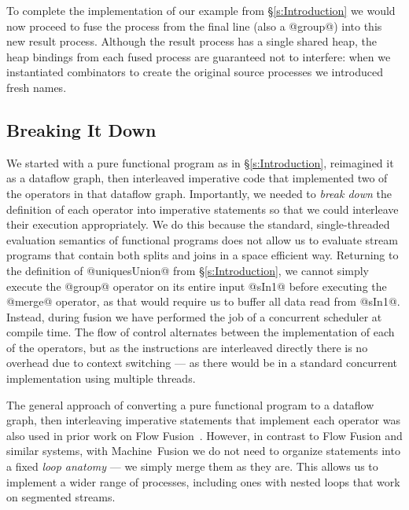 To complete the implementation of our example from \S\ref{s:Introduction} we would now proceed to fuse the process from the final line (also a @group@) into this new result process.
Although the result process has a single shared heap, the heap bindings from each fused process are guaranteed not to interfere: when we instantiated combinators to create the original source processes we introduced fresh names. 


\subsection{Breaking It Down}
We started with a pure functional program as in \S\ref{s:Introduction}, reimagined it as a dataflow graph, then interleaved imperative code that implemented two of the operators in that dataflow graph. Importantly, we needed to \emph{break down} the definition of each operator into imperative statements so that we could interleave their execution appropriately. We do this because the standard, single-threaded evaluation semantics of functional programs does not allow us to evaluate stream programs that contain both splits and joins in a space efficient way. Returning to the definition of @uniquesUnion@ from \S\ref{s:Introduction}, we cannot simply execute the @group@ operator on its entire input @sIn1@ before executing the @merge@ operator, as that would require us to buffer all data read from @sIn1@. Instead, during fusion we have performed the job of a concurrent scheduler at compile time. The flow of control alternates between the implementation of each of the operators, but as the instructions are interleaved directly there is no overhead due to context switching --- as there would be in a standard concurrent implementation using multiple threads.

The general approach of converting a pure functional program to a dataflow graph, then interleaving imperative statements that implement each operator was also used in prior work on Flow Fusion~\cite{lippmeier2013data}. However, in contrast to Flow Fusion and similar systems, with \mbox{Machine Fusion} we do not need to organize statements into a fixed \emph{loop anatomy} --- we simply merge them as they are. This allows us to implement a wider range of processes, including ones with nested loops that work on segmented streams.

